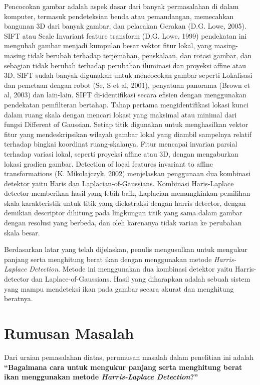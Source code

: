 Pencocokan gambar adalah aspek dasar dari banyak permasalahan di dalam komputer, termasuk  pendeteksian benda atau pemandangan, memecahkan bangunan 3D dari banyak gambar, 
dan pelacakan Gerakan (D.G. Lowe, 2005). SIFT atau Scale Invariant feature transform (D.G. Lowe, 1999) pendekatan ini mengubah gambar menjadi kumpulan besar vektor fitur lokal, 
yang masing-masing tidak berubah terhadap terjemahan, penskalaan, dan rotasi gambar, dan sebagian tidak berubah terhadap perubahan iluminasi 
dan proyeksi affine atau 3D. SIFT sudah banyak digunakan untuk mencocokan gambar seperti Lokalisasi dan pemetaan dengan robot (Se, S et al, 2001), penyatuan panorama (Brown et al, 2003) dan lain-lain. 
SIFT di-identifikasi secara efisien dengan menggunakan pendekatan pemfilteran bertahap. Tahap pertama mengidentifikasi lokasi kunci dalam ruang skala dengan mencari lokasi yang maksimal atau minimal dari fungsi Different of Gaussian. 
Setiap titik digunakan untuk menghasilkan vektor fitur yang mendeskripsikan wilayah gambar lokal yang diambil sampelnya relatif terhadap bingkai koordinat ruang-skalanya. Fitur mencapai invarian parsial terhadap variasi lokal, 
seperti proyeksi affine atau 3D, dengan mengaburkan lokasi gradien gambar. Detection of local features invariant to affine transformations (K. Mikolajczyk, 2002) menjelaskan penggunaan dua kombinasi detektor yaitu Haris dan Laplacian-of-Gaussians. 
Kombinasi Haris-Laplace detector memberikan hasil yang lebih baik, Laplacian memungkinkan pemilihan skala karakteristik untuk titik yang diekstraksi dengan harris detector, dengan demikian descriptor dihitung pada lingkungan titik yang sama dalam gambar dengan resolusi yang berbeda, 
dan oleh karenanya tidak varian ke perubahan skala besar.
 
Berdasarkan latar yang telah dijelaskan, penulis mengusulkan untuk mengukur panjang serta menghitung berat ikan dengan menggunakan metode \emph{Harris-Laplace Detection}. 
Metode ini menggunakan dua kombinasi detektor yaitu Harris-detector dan Laplace-of-Gaussians. Hasil yang diharapkan adalah sebuah sistem yang mampu mendeteksi ikan pada gambar secara akurat dan menghitung beratnya.


\section{Rumusan Masalah}
Dari uraian pemasalahan diatas, perumusan masalah dalam penelitian ini adalah \textbf{“Bagaimana cara untuk mengukur panjang serta menghitung berat ikan menggunakan metode \emph{Harris-Laplace Detection}?”}

